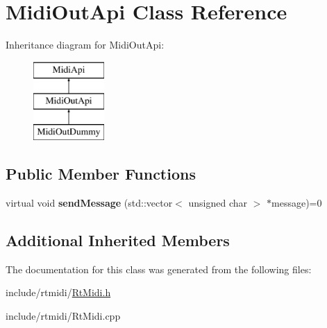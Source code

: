 \hypertarget{class_midi_out_api}{}\section{Midi\+Out\+Api Class Reference}
\label{class_midi_out_api}
Inheritance diagram for Midi\+Out\+Api\+:\begin{figure}[H]
\begin{center}
\leavevmode
\includegraphics[height=3.000000cm]{class_midi_out_api}
\end{center}
\end{figure}
\subsection*{Public Member Functions}
\begin{DoxyCompactItemize}
\item 
virtual void {\bfseries send\+Message} (std\+::vector$<$ unsigned char $>$ $\ast$message)=0\hypertarget{class_midi_out_api_a210c571e95b67425f73554d6a212f1d6}{}\label{class_midi_out_api_a210c571e95b67425f73554d6a212f1d6}

\end{DoxyCompactItemize}
\subsection*{Additional Inherited Members}


The documentation for this class was generated from the following files\+:\begin{DoxyCompactItemize}
\item 
include/rtmidi/\hyperlink{_rt_midi_8h}{Rt\+Midi.\+h}\item 
include/rtmidi/Rt\+Midi.\+cpp\end{DoxyCompactItemize}
